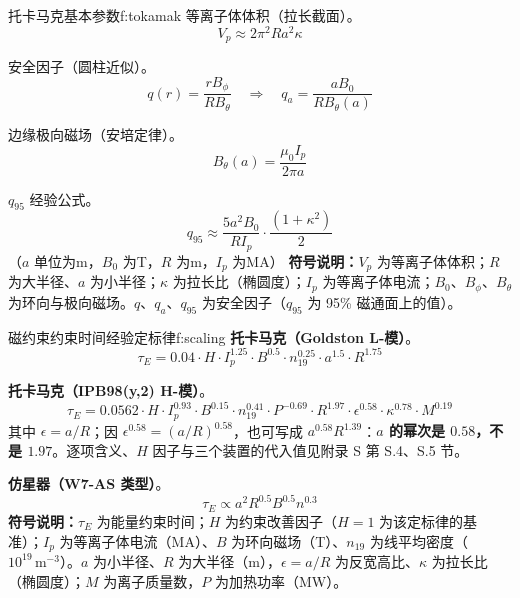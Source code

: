 \begin{formulabox}{托卡马克基本参数}{f:tokamak}
等离子体体积（拉长截面）。
\[
    V_p \approx 2\pi^2 R a^2 \kappa
\]

安全因子（圆柱近似）。
\[
    q(r) = \frac{r B_{\phi}}{R B_{\theta}} \quad\Rightarrow\quad q_a = \frac{a B_0}{R B_{\theta}(a)}
\]

边缘极向磁场（安培定律）。
\begin{equation}
    B_{\theta}(a) = \frac{\mu_0 I_p}{2\pi a}
\label{eq:ch10-poloidal-field-ex}
\end{equation}

$q_{95}$ 经验公式。
\[
    q_{95} \approx \frac{5 a^2 B_0}{R I_p}\cdot\frac{(1+\kappa^2)}{2}
\]
（$a$ 单位为m，$B_0$ 为T，$R$ 为m，$I_p$ 为MA）
\textbf{符号说明：}$V_p$ 为等离子体体积；$R$ 为大半径、$a$ 为小半径；$\kappa$ 为拉长比（椭圆度）；$I_p$ 为等离子体电流；$B_0$、$B_{\phi}$、$B_{\theta}$ 为环向与极向磁场。$q$、$q_a$、$q_{95}$ 为安全因子（$q_{95}$ 为 95\% 磁通面上的值）。
\end{formulabox}

\begin{formulabox}{磁约束约束时间经验定标律}{f:scaling}
\textbf{托卡马克（Goldston L-模）}。
\[
    \tau_E = 0.04 \cdot H \cdot I_p^{1.25} \cdot B^{0.5} \cdot n_{19}^{0.25} \cdot a^{1.5} \cdot R^{1.75}
\]

\textbf{托卡马克（IPB98(y,2) H-模）}。
\[
    \tau_E = 0.0562 \cdot H \cdot I_p^{0.93} \cdot B^{0.15} \cdot n_{19}^{0.41} \cdot P^{-0.69} \cdot R^{1.97} \cdot \epsilon^{0.58} \cdot \kappa^{0.78} \cdot M^{0.19}
\]
其中 $\epsilon=a/R$；因 $\epsilon^{0.58}=(a/R)^{0.58}$，也可写成 $a^{0.58}R^{1.39}$：\textbf{$a$ 的幂次是 $0.58$，不是 $1.97$}。逐项含义、$H$ 因子与三个装置的代入值见附录 S 第 S.4、S.5 节。

\textbf{仿星器（W7-AS 类型）}。
\[
    \tau_E \propto a^2 R^{0.5} B^{0.5} n^{0.3}
\]
\textbf{符号说明：}$\tau_E$ 为能量约束时间；$H$ 为约束改善因子（$H=1$ 为该定标律的基准）；$I_p$ 为等离子体电流（MA）、$B$ 为环向磁场（T）、$n_{19}$ 为线平均密度（$10^{19}\,\mathrm{m^{-3}}$）。$a$ 为小半径、$R$ 为大半径（m），$\epsilon=a/R$ 为反宽高比、$\kappa$ 为拉长比（椭圆度）；$M$ 为离子质量数，$P$ 为加热功率（MW）。
\end{formulabox}

